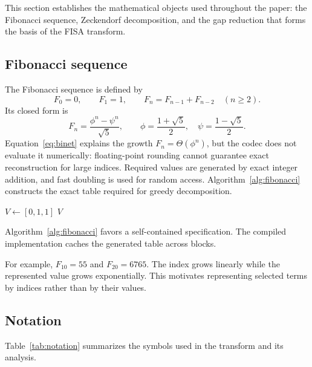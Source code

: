 \documentclass[a4paper,fleqn]{cas-dc}
\begin{document}
This section establishes the mathematical objects used throughout the paper:
the Fibonacci sequence, Zeckendorf decomposition, and the gap reduction that
forms the basis of the FISA transform.

\subsection{Fibonacci sequence}

The Fibonacci sequence is defined by
\begin{equation}
F_0=0,\qquad F_1=1,\qquad F_n=F_{n-1}+F_{n-2}\quad(n\geq2).
\label{eq:fibonacci}
\end{equation}
Its closed form is
\begin{equation}
F_n=\frac{\phi^n-\psi^n}{\sqrt{5}},\qquad
\phi=\frac{1+\sqrt{5}}{2},\quad\psi=\frac{1-\sqrt{5}}{2}.
\label{eq:binet}
\end{equation}
Equation~\eqref{eq:binet} explains the growth
$F_n=\Theta(\phi^n)$, but the codec does not evaluate it numerically:
floating-point rounding cannot guarantee exact reconstruction for large
indices. Required values are generated by exact integer addition, and fast
doubling is used for random access. Algorithm~\ref{alg:fibonacci} constructs
the exact table required for greedy decomposition.

\begin{algorithm}[t]
\caption{\texttt{FibonacciTable($d$)}}
\label{alg:fibonacci}
$V\leftarrow[0,1,1]$\;
\Return $V$\;
\end{algorithm}

Algorithm~\ref{alg:fibonacci} favors a self-contained specification. The
compiled implementation caches the generated table across blocks.

For example, $F_{10}=55$ and $F_{20}=6765$. The index grows linearly while
the represented value grows exponentially. This motivates representing
selected terms by indices rather than by their values.

\subsection{Notation}

Table~\ref{tab:notation} summarizes the symbols used in the transform and its
analysis.
\end{document}
